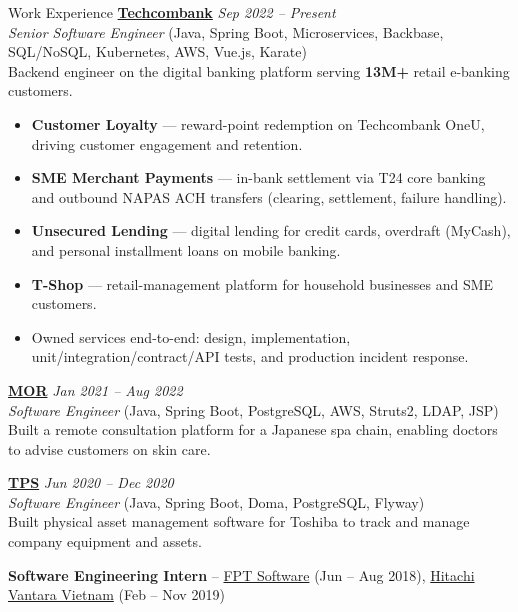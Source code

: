 \documentclass{resume} %
\begin{document}
\begin{rSection}{Work Experience}
\href{https://techcombank.com/}{\textbf{Techcombank}} \hfill {\em Sep 2022 -- Present} \\
\textit{Senior Software Engineer} (Java, Spring Boot, Microservices, Backbase, SQL/NoSQL, Kubernetes, AWS, Vue.js, Karate) \\
Backend engineer on the digital banking platform serving \textbf{13M+} retail e-banking customers.
\begin{itemize}
    \item \textbf{Customer Loyalty} — reward-point redemption on Techcombank OneU, driving customer engagement and retention.
    \item \textbf{SME Merchant Payments} — in-bank settlement via T24 core banking and outbound NAPAS ACH transfers (clearing, settlement, failure handling).
    \item \textbf{Unsecured Lending} — digital lending for credit cards, overdraft (MyCash), and personal installment loans on mobile banking.
    \item \textbf{T-Shop} — retail-management platform for household businesses and SME customers.
    \item Owned services end-to-end: design, implementation, unit/integration/contract/API tests, and production incident response.
\end{itemize}

\href{https://morsoftware.com/}{\bf MOR} \hfill {\em Jan 2021 -- Aug 2022} \\
\textit{Software Engineer} (Java, Spring Boot, PostgreSQL, AWS, Struts2, LDAP, JSP) \\
Built a remote consultation platform for a Japanese spa chain, enabling doctors to advise customers on skin care.

\href{https://tpssoft.com/}{\bf TPS} \hfill {\em Jun 2020 -- Dec 2020} \\
\textit{Software Engineer} (Java, Spring Boot, Doma, PostgreSQL, Flyway) \\
Built physical asset management software for Toshiba to track and manage company equipment and assets.

{\bf Software Engineering Intern} -- \href{https://fptsoftware.com/}{FPT Software} (Jun -- Aug 2018), \href{https://www.hitachivantara.com/go/ve/home/}{Hitachi Vantara Vietnam} (Feb -- Nov 2019)

\end{rSection}
\end{document}
